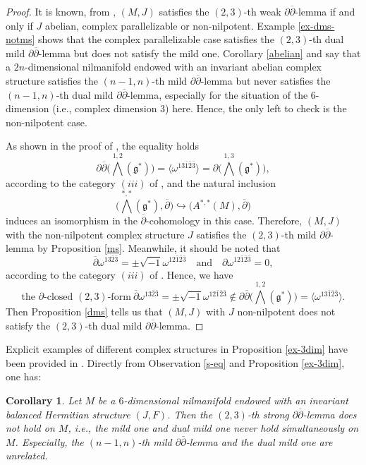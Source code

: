 \documentclass[12pt]{amsart}
\numberwithin{equation}{section}
\newtheorem{corollary}  [theorem]     {Corollary}
\renewcommand{\1}{\mathds{1}}
\newcommand{\db}{\overline{\partial}}
\renewcommand{\>}{\rightarrow}
\newcommand{\p}{\partial}
\def\p{\partial}
\def\b{\bar}
\begin{document}
\begin{proof}
It is known, from \cite[Proposition 3.6]{UV}, $(M,J)$ satisfies the
$(2,3)$-th weak $\p\db$-lemma if and only if $J$ abelian, complex
parallelizable or non-nilpotent. Example \ref{ex-dms-notms} shows
that the complex parallelizable case satisfies the $(2,3)$-th dual
mild $\p\db$-lemma but does not satisfy the mild one. Corollary
\ref{abelian} and \cite[Proposition 2.9]{AU} say that a
$2n$-dimensional nilmanifold endowed with an invariant abelian
complex structure satisfies the $(n-1,n)$-th mild $\p\db$-lemma but
never satisfies the $(n-1,n)$-th dual mild $\p\db$-lemma, especially
for the situation of the $6$-dimension (i.e., complex dimension $3$)
here. Hence, the only left to check is the non-nilpotent case.

As shown in the proof of \cite[Proposition 3.6]{UV}, the equality
holds
\[ \p \db \big( \bigwedge^{1,2}(\mathfrak{g}^{*}) \big) = \langle \omega^{13\b{1}\b{2}\b{3}}\rangle =
\p \big( \bigwedge^{1,3}(\mathfrak{g}^*) \big),\] according to the
category $(iii)$ of \cite[Proposition 2.3]{UV}, and the natural
inclusion
\[\big(\bigwedge^{*,*}(\mathfrak{g}^*),\db\big)\hookrightarrow \big(A^{*,*}(M),\db\big)\] induces an isomorphism
in the $\db$-cohomology in this case. Therefore, $(M,J)$ with the
non-nilpotent complex structure $J$ satisfies the $(2,3)$-th mild
$\p\db$-lemma by Proposition \ref{ms}. Meanwhile, it should be noted
that
\[ \db \omega^{13\b{2}\b{3}} = \pm \sqrt{-1} \omega^{12\b{1}\b{2}\b{3}}\quad \text{and} \quad
\p \omega^{12\b{1}\b{2}\b{3}} =0,\] according to the category
$(iii)$ of \cite[Proposition 2.3]{UV}. Hence, we have
\[ \text{the $\p$-closed $(2,3)$-form}\  \db \omega^{13\b{2}\b{3}} = \pm \sqrt{-1} \omega^{12\b{1}\b{2}\b{3}}
\notin \p \db \big( \bigwedge^{1,2}(\mathfrak{g}^{*}) \big) =
\langle \omega^{13\b{1}\b{2}\b{3}}\rangle.\] Then Proposition
\ref{dms} tells us that $(M,J)$ with $J$ non-nilpotent does not
satisfy the $(2,3)$-th dual mild $\p\db$-lemma.
\end{proof}

Explicit examples of different complex structures in Proposition
\ref{ex-3dim} have been provided in \cite{UV}.
Directly from Observation \ref{s-eq} and Proposition
\ref{ex-3dim}, one has:
\begin{corollary}
Let $M$ be a $6$-dimensional nilmanifold endowed with an invariant
balanced Hermitian structure $(J,F)$. Then the $(2,3)$-th strong
$\p\db$-lemma does not hold on $M$, i.e., the mild one and dual mild
one never hold simultaneously on $M$. Especially, the $(n-1,n)$-th
mild $\p\db$-lemma and the dual mild one are unrelated.
\end{corollary}
\end{document}
